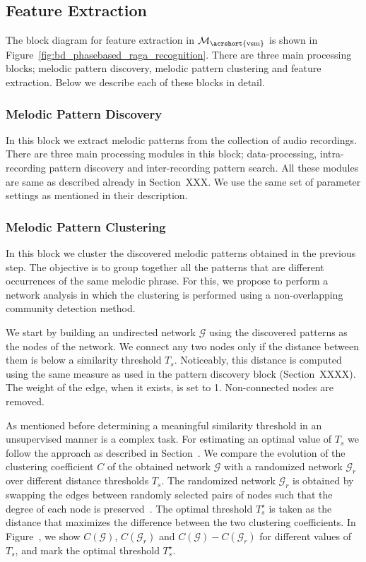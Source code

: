\subsection{Feature Extraction}
\label{sec:vsm_feature_extraction}

The block diagram for feature extraction in $\mathcal{M}_\mathrm{\acrshort{vsm}}$ is shown in Figure~\ref{fig:bd_phasebased_raga_recognition}. There are three main processing blocks; melodic pattern discovery, melodic pattern clustering and feature extraction. Below we describe each of these blocks in detail. 

\subsubsection{Melodic Pattern Discovery}
\label{sec:vsm_feature_extraction_pattern_discovery}
In this block we extract melodic patterns from the collection of audio recordings. There are three main processing modules in this block; data-processing, intra-recording pattern discovery and inter-recording pattern search. All these modules are same as described already in Section~XXX. We use the same set of parameter settings as mentioned in their description.

\subsubsection{Melodic Pattern Clustering}
\label{sec:vsm_feature_extraction_pattern_clustering}

In this block we cluster the discovered melodic patterns obtained in the previous step. The objective is to group together all the patterns that are different occurrences of the same melodic phrase. For this, we propose to perform a network analysis in which the clustering is performed using a non-overlapping community detection method. 

We start by building an undirected network $\mathcal{G}$ using the discovered patterns as the nodes of the network. We connect any two nodes only if the distance between them is below a similarity threshold $T_s$. Noticeably, this distance is computed using the same measure as used in the pattern discovery block (Section~XXXX). The weight of the edge, when it exists, is set to 1. Non-connected nodes are removed.

As mentioned before determining a meaningful similarity threshold in an unsupervised manner is a complex task. For estimating an optimal value of $T_s$ we follow the approach as described in Section~. We compare the evolution of the clustering coefficient $C$ of the obtained network $\mathcal{G}$ with a randomized network $\mathcal{G}_r$ over different distance thresholds $T_s$. The randomized network $\mathcal{G}_r$ is obtained by swapping the edges between randomly selected pairs of nodes such that the degree of each node is preserved~\cite{maslov2002specificity}. The optimal threshold $T_{s}^\star$ is taken as the distance that maximizes the difference between the two clustering coefficients.  In Figure~, we show $C(\mathcal{G})$, $C(\mathcal{G}_r)$ and $C(\mathcal{G})-C(\mathcal{G}_r)$ for different values of $T_{s}$, and mark the optimal threshold $T_{s}^\star$.

